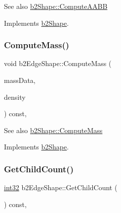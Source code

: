 \begin{DoxySeeAlso}{See also}
\mbox{\hyperlink{classb2_shape_a88e9807fab0c8ca9a98d8926e50a1411}{b2\+Shape\+::\+Compute\+A\+A\+BB}} 
\end{DoxySeeAlso}


Implements \mbox{\hyperlink{classb2_shape_a88e9807fab0c8ca9a98d8926e50a1411}{b2\+Shape}}.

\mbox{\label{classb2_edge_shape_ac738c1e0ab2f4dfbab26e3942efa60af}} 
\subsubsection{\texorpdfstring{ComputeMass()}{ComputeMass()}}
{\footnotesize\ttfamily void b2\+Edge\+Shape\+::\+Compute\+Mass (\begin{DoxyParamCaption}\item[{\mbox{\hyperlink{structb2_mass_data}{b2\+Mass\+Data}} $\ast$}]{mass\+Data,  }\item[{\mbox{\hyperlink{b2_settings_8h_aacdc525d6f7bddb3ae95d5c311bd06a1}{float32}}}]{density }\end{DoxyParamCaption}) const\hspace{0.3cm}{\ttfamily [override]}, {\ttfamily [virtual]}}

\begin{DoxySeeAlso}{See also}
\mbox{\hyperlink{classb2_shape_a61b365526241b47f124789b0309cac69}{b2\+Shape\+::\+Compute\+Mass}} 
\end{DoxySeeAlso}


Implements \mbox{\hyperlink{classb2_shape_a61b365526241b47f124789b0309cac69}{b2\+Shape}}.

\mbox{\label{classb2_edge_shape_ae9dcaa2f4b77fcf182d29159658da82a}} 
\subsubsection{\texorpdfstring{GetChildCount()}{GetChildCount()}}
{\footnotesize\ttfamily \mbox{\hyperlink{b2_settings_8h_a43d43196463bde49cb067f5c20ab8481}{int32}} b2\+Edge\+Shape\+::\+Get\+Child\+Count (\begin{DoxyParamCaption}{ }\end{DoxyParamCaption}) const\hspace{0.3cm}{\ttfamily [override]}, {\ttfamily [virtual]}}

